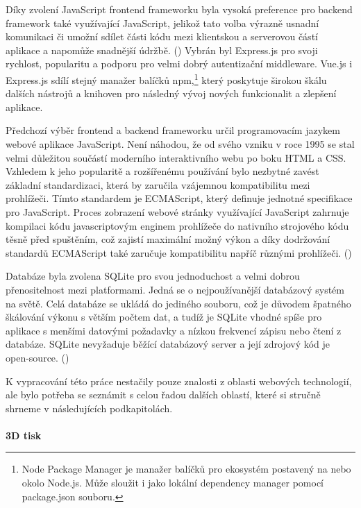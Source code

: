 \documentclass[twoside, 12pt]{article}
\begin{document}
Díky zvolení JavaScript frontend frameworku byla vysoká preference pro backend framework také využívající JavaScript, jelikož tato volba výrazně usnadní komunikaci či umožní sdílet části kódu mezi klientskou a serverovou částí aplikace a napomůže snadnější údržbě.  (\cite{Flanagan2020}) Vybrán byl Express.js pro svoji rychlost, popularitu a podporu pro velmi dobrý autentizační middleware. Vue.js i Express.js sdílí stejný manažer balíčků npm,\footnote{Node Package Manager je manažer balíčků pro ekosystém postavený na nebo okolo Node.js. Může sloužit i jako lokální dependency manager pomocí package.json souboru.} který poskytuje širokou škálu dalších nástrojů a knihoven pro následný vývoj nových funkcionalit a zlepšení aplikace.


Předchozí výběr frontend a backend frameworku určil programovacím jazykem webové aplikace JavaScript. Není náhodou, že od svého vzniku v roce 1995 se stal velmi důležitou součástí moderního interaktivního webu po boku HTML a CSS. Vzhledem k jeho popularitě a rozšířenému používání bylo nezbytné zavést základní standardizaci, která by zaručila vzájemnou kompatibilitu mezi prohlížeči. Tímto standardem je ECMAScript, který definuje jednotné specifikace pro JavaScript. Proces zobrazení webové stránky využívající JavaScript zahrnuje kompilaci kódu javascriptovým enginem prohlížeče do nativního strojového kódu těsně před spuštěním, což zajistí maximální možný výkon a díky dodržování standardů ECMAScript také zaručuje kompatibilitu napříč různými prohlížeči. (\cite{Flanagan2020})


Databáze byla zvolena SQLite pro svou jednoduchost a velmi dobrou přenositelnost mezi platformami. Jedná se o nejpoužívanější databázový systém na světě. Celá databáze se ukládá do jediného souboru, což je důvodem špatného škálování výkonu s větším počtem dat, a tudíž je SQLite vhodné spíše pro aplikace s menšími datovými požadavky a nízkou frekvencí zápisu nebo čtení z databáze. SQLite nevyžaduje běžící databázový server a její zdrojový kód je open-source. (\cite{SQLite})

\clearpage
{}

K vypracování této práce nestačily pouze znalosti z oblasti webových technologií, ale bylo potřeba se seznámit s celou řadou dalších oblastí, které si stručně shrneme v následujících podkapitolách.
\\
\\
\textbf{3D tisk}
\end{document}
